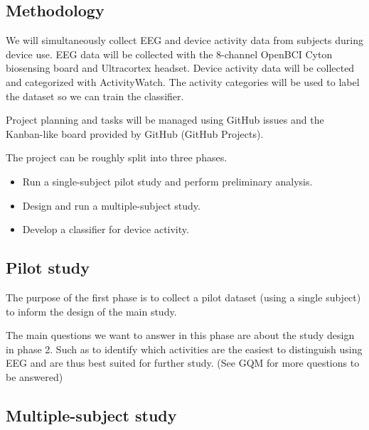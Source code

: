 \documentclass{IEEEtran}
\begin{document}
\begin{refsection}
\section{Methodology}


We will simultaneously collect EEG and device activity data from subjects during device use. EEG data will be collected with the 8-channel OpenBCI Cyton biosensing board and Ultracortex headset. Device activity data will be collected and categorized with ActivityWatch. The activity categories will be used to label the dataset so we can train the classifier.

Project planning and tasks will be managed using GitHub issues and the Kanban-like board provided by GitHub (GitHub Projects).

The project can be roughly split into three phases.

\begin{itemize}
 \item Run a single-subject pilot study and perform preliminary analysis.
 \item Design and run a multiple-subject study.
 \item Develop a classifier for device activity.
\end{itemize}

\subsection{Pilot study}

The purpose of the first phase is to collect a pilot dataset (using a single subject) to inform the design of the main study.

The main questions we want to answer in this phase are about the study design in phase 2. Such as to identify which activities are the easiest to distinguish using EEG and are thus best suited for further study. (See GQM for more questions to be answered)

\subsection{Multiple-subject study}



\end{refsection}
\end{document}
